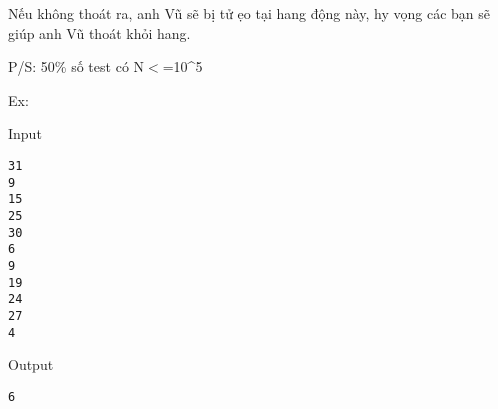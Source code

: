    Nếu không thoát ra, anh Vũ sẽ bị tử ẹo tại hang động này, hy vọng các bạn sẽ giúp anh Vũ thoát khỏi hang.  



            P/S:                50\% số test có N$<$=10\textasciicircum5  



            Ex:         



   Input  




\begin{verbatim}
31
9
15
25
30
6
9
19
24
27
4\end{verbatim}





   Output  




\begin{verbatim}
6\end{verbatim}

